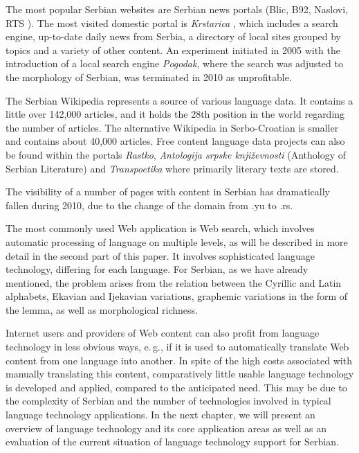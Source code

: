 \begin{multicols}{2}
The most popular Serbian websites are Serbian news portals (Blic, \cite{BLIC} B92, \cite{B92} Naslovi, \cite{NASLOVI} RTS \cite{RTS}). The most visited domestic portal is \textit{Krstarica} \cite{KRSTARICA}, which includes a search engine, up-to-date daily news from Serbia, a directory of local sites grouped by topics and a variety of other content. An experiment initiated in 2005 with the introduction of a local search engine \textit{Pogodak}, where the search was adjusted to the morphology of Serbian, was terminated in 2010 as unprofitable.

The Serbian Wikipedia represents a source of various language data. It contains a little over 142,000 articles, and it holds the 28th position \cite{WIKI} in the world regarding the number of articles. The alternative Wikipedia in Serbo-Croatian \cite{SHWIKI} is smaller and contains about 40,000 articles. Free content language data projects can also be found within the portals \textit{Rastko}, \cite{RASTKO} \textit{Antologija srpske književnosti} \cite{ASK} (Anthology of Serbian Literature) and \textit{Transpoetika} \cite{TRPOET} where primarily literary texts are stored. 

The visibility of a number of pages with content in Serbian has dramatically fallen during 2010, due to the change of the domain from .yu to .rs. 

The most commonly used Web application is Web search, which involves automatic processing of language on multiple levels, as will be described in more detail in the second part of this paper. It involves sophisticated language technology, differing for each language. For Serbian, as we have already mentioned, the problem arises from the relation between the Cyrillic and Latin alphabets, Ekavian and Ijekavian variations, graphemic variations in the form of the lemma, as well as morphological richness. 

Internet users and providers of Web content can also profit from language technology in less obvious ways, e.\,g., if it is used to automatically translate Web content from one language into another. In spite of the high costs associated with manually translating this content, comparatively little usable language technology is developed and applied, compared to the anticipated need. This may be due to the complexity of Serbian and the number of technologies involved in typical language technology applications. In the next chapter, we will present an overview of language technology and its core application areas as well as an evaluation of the current situation of language technology support for Serbian.  
\end{multicols}

